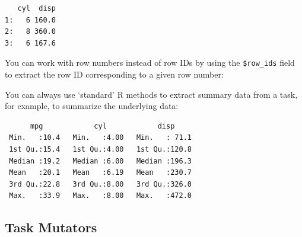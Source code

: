 \begin{verbatim}
   cyl  disp
1:   6 160.0
2:   8 360.0
3:   6 167.6
\end{verbatim}

\begin{tcolorbox}[enhanced jigsaw, opacitybacktitle=0.6, rightrule=.15mm, opacityback=0, arc=.35mm, breakable, titlerule=0mm, colframe=quarto-callout-tip-color-frame, coltitle=black, bottomrule=.15mm, toprule=.15mm, colback=white, colbacktitle=quarto-callout-tip-color!10!white, bottomtitle=1mm, toptitle=1mm, title=\textcolor{quarto-callout-tip-color}{\faLightbulb}\hspace{0.5em}{Accessing Rows by Number}, leftrule=.75mm, left=2mm]

You can work with row numbers instead of row IDs by using the
\texttt{\$row\_ids} field to extract the row ID corresponding to a given
row number:

\begin{Shaded}
\begin{Highlighting}[]
\SpecialCharTok{$}\NormalTok{(}\SpecialCharTok{$}\NormalTok{row\_ids[}\NormalTok{])}
\end{Highlighting}
\end{Shaded}

\end{tcolorbox}

You can always use `standard' R methods to extract summary data from a
task, for example, to summarize the underlying data:

\begin{Shaded}
\begin{Highlighting}[]
\NormalTok{(}
\end{Highlighting}
\end{Shaded}

\begin{verbatim}
      mpg            cyl            disp      
 Min.   :10.4   Min.   :4.00   Min.   : 71.1  
 1st Qu.:15.4   1st Qu.:4.00   1st Qu.:120.8  
 Median :19.2   Median :6.00   Median :196.3  
 Mean   :20.1   Mean   :6.19   Mean   :230.7  
 3rd Qu.:22.8   3rd Qu.:8.00   3rd Qu.:326.0  
 Max.   :33.9   Max.   :8.00   Max.   :472.0  
\end{verbatim}

\hypertarget{sec-tasks-mutators}{%
\subsection{Task Mutators}\label{sec-tasks-mutators}}

